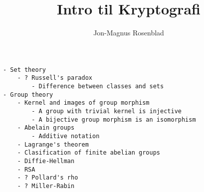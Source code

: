 \documentclass[norks, draft]{article}
\author{Jon-Magnus Rosenblad}
\title{Intro til Kryptografi}
\begin{document}
\maketitle

\tableofcontents
\listoftodos

%








\begin{verbatim}
- Set theory
    - ? Russell's paradox
        - Difference between classes and sets
- Group theory
    - Kernel and images of group morphism
        - A group with trivial kernel is injective
        - A bijective group morphism is an isomorphism
    - Abelain groups
        - Additive notation
    - Lagrange's theorem
    - Clasification of finite abelian groups
    - Diffie-Hellman
    - RSA
    - ? Pollard's rho
    - ? Miller-Rabin
\end{verbatim}


\printbibliography
\end{document}

